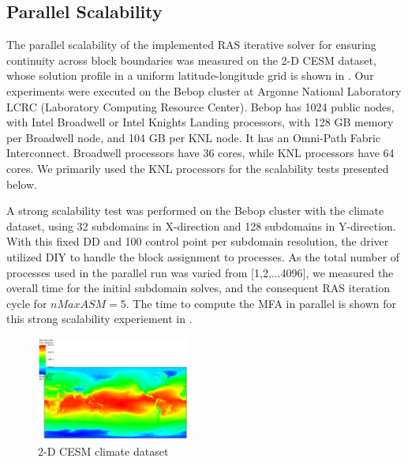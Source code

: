 

%



\subsection{Parallel Scalability}\label{sec:parallel-scalability}

The parallel scalability of the implemented RAS iterative solver for ensuring continuity across block boundaries was measured on the 2-D CESM dataset, whose solution profile in a uniform latitude-longitude grid is shown in . 
Our experiments were executed on the Bebop cluster at
Argonne National Laboratory LCRC (Laboratory Computing Resource Center). Bebop has 1024 public nodes, with Intel Broadwell or Intel Knights Landing processors, with 128 GB memory per Broadwell node, and 104 GB per KNL node. It has an Omni-Path Fabric Interconnect. Broadwell processors have 36 cores, while KNL processors have 64 cores. We primarily used the KNL processors for the scalability tests presented below.

A strong scalability test was performed on the Bebop cluster with the climate dataset, using 32 subdomains in X-direction and 128 subdomains in Y-direction. With this fixed DD and 100 control point per subdomain resolution, the driver utilized DIY to handle the block assignment to processes. As the total number of processes used in the parallel run was varied from [1,2,$\ldots$4096], we measured the overall time for the initial subdomain solves, and the consequent RAS iteration cycle for $nMaxASM=5$. The time to compute the MFA in parallel is shown for this strong scalability experiement in .

\begin{figure}
	\includegraphics[width=0.45\textwidth]{figures/cesm-profile.png}
	\caption{2-D CESM climate dataset}
	\label{fig:cesm-2d-profile]}
\end{figure}

